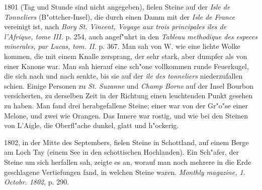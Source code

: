 \documentclass[a4paper, 11pt, oneside, polutonikogreek, german]{article}
\begin{document}
1801 (Tag und Stunde sind nicht angegeben), fielen Steine auf der \emph{Isle de Tonneliers} (B"ottcher-Insel), die durch einen Damm mit der \emph{Isle de France} vereinigt ist, nach \emph{Bory St. Vincent, Voyage aux trois principales iles de l'Afrique, tome III.} p. 254, auch angef"uhrt in den \emph{Tableau methodique des especes minerales, par Lucas, tom. II.} p. 367. Man sah von W. wie eine lichte Wolke kommen, die mit einem Knalle zersprang, der sehr stark, aber dumpfer als von einer Kanone war. Man sah hierauf eine sch"one vollkommen runde Feuerkugel, die sich nach und nach senkte, bis sie auf der \emph{ile des tonneliers} niederzufallen schien. Einige Personen zu \emph{St. Suzanne} und \emph{Champ Borne} auf der Insel Bourbon versicherten, zu derselben Zeit in der Richtung einen leuchtenden Punkt gesehen zu haben. Man fand drei herabgefallene Steine; einer war von der Gr"o"se einer Melone, und zwei wie Orangen. Das Innere war rostig, und wie bei den Steinen von L'Aigle, die Oberfl"ache dunkel, glatt und h"ockerig.

1802, in der Mitte des Septembers, fielen Steine in Schottland, auf einem Berge am Loch Tay (einem See in den schottischen Hochlanden). Ein Sch"afer, der Steine um sich herfallen sah, zeigte es an, worauf man noch mehrere in die Erde geschlagene Vertiefungen fand, in welchen Steine waren. \emph{Monthly magazine, 1. Octobr. 1802}, p. 290.
\end{document}
